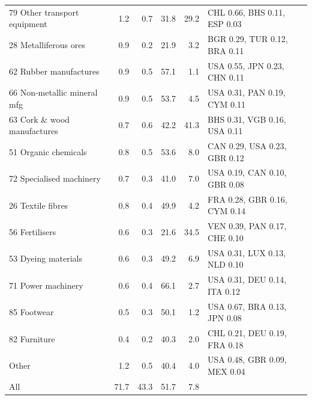 \begin{tabular}{@{}l r r r r l@{}}
79 Other transport equipment & 1.2 & 0.7 & 31.8 & 29.2 & CHL 0.66, BHS 0.11, ESP 0.03 \\
28 Metalliferous ores & 0.9 & 0.2 & 21.9 & 3.2 & BGR 0.29, TUR 0.12, BRA 0.11 \\
62 Rubber manufactures & 0.9 & 0.5 & 57.1 & 1.1 & USA 0.55, JPN 0.23, CHN 0.11 \\
66 Non-metallic mineral mfg & 0.9 & 0.5 & 53.7 & 4.5 & USA 0.31, PAN 0.19, CYM 0.11 \\
63 Cork \& wood manufactures & 0.7 & 0.6 & 42.2 & 41.3 & BHS 0.31, VGB 0.16, USA 0.11 \\
51 Organic chemicals & 0.8 & 0.5 & 53.6 & 8.0 & CAN 0.29, USA 0.23, GBR 0.12 \\
72 Specialised machinery & 0.7 & 0.3 & 41.0 & 7.0 & USA 0.19, CAN 0.10, GBR 0.08 \\
26 Textile fibres & 0.8 & 0.4 & 49.9 & 4.2 & FRA 0.28, GBR 0.16, CYM 0.14 \\
56 Fertilisers & 0.6 & 0.3 & 21.6 & 34.5 & VEN 0.39, PAN 0.17, CHE 0.10 \\
53 Dyeing materials & 0.6 & 0.3 & 49.2 & 6.9 & USA 0.31, LUX 0.13, NLD 0.10 \\
71 Power machinery & 0.6 & 0.4 & 66.1 & 2.7 & USA 0.31, DEU 0.14, ITA 0.12 \\
85 Footwear & 0.5 & 0.3 & 50.1 & 1.2 & USA 0.67, BRA 0.13, JPN 0.08 \\
82 Furniture & 0.4 & 0.2 & 40.3 & 2.0 & CHL 0.21, DEU 0.19, FRA 0.18 \\
Other & 1.2 & 0.5 & 40.4 & 4.0 & USA 0.48, GBR 0.09, MEX 0.04 \\
\midrule
All & 71.7 & 43.3 & 51.7 & 7.8 & \\
\bottomrule
\end{tabular}
